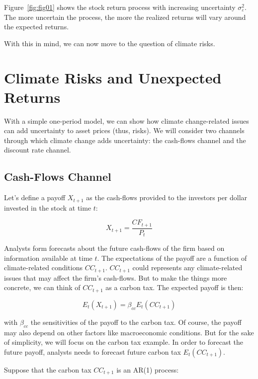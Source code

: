 Figure~\ref{fig:fig01} shows the stock return process
with increasing uncertainty $\sigma_{\varepsilon}^2$.
The more uncertain the process, the more
the realized returns will vary around the
expected returns. 

With this in mind, we can now move to the question 
of climate risks. 

\section{Climate Risks and Unexpected Returns}

With a simple one-period model, we can
show how climate change-related issues can add uncertainty
to asset prices (thus, risks).
We will consider two channels through which
climate change adds uncertainty: the cash-flows channel
and the discount rate channel.

\subsection{Cash-Flows Channel}

Let's define a payoff $X_{t+1}$ as the 
cash-flows provided to the investors per dollar invested in the stock at time $t$:

\begin{equation}
    X_{t+1} = \frac{CF_{t+1}}{P_t}
\end{equation}

Analysts form forecasts 
about the future cash-flows of the firm
based on information available at time $t$.
The expectations of the payoff
are a function of climate-related
conditions $CC_{t+1}$. $CC_{t+1}$ could represents 
any climate-related issues that may affect the
firm's cash-flows. But to make the things more 
concrete, we can think of $CC_{t+1}$ as 
a carbon tax. 
The expected payoff is then:

\begin{equation}
    E_t(X_{t+1}) = \beta_{cc} E_t(CC_{t+1})
\end{equation}

with $\beta_{cc}$ the sensitivities of 
the payoff to the carbon tax. Of course,
the payoff may also depend on other factors
like macroeconomic conditions. But 
for the sake of simplicity, we will focus
on the carbon tax example.
In order to forecast the future payoff, analysts 
needs to forecast future carbon tax
$E_t(CC_{t+1})$.

Suppose that the carbon tax $CC_{t+1}$ is an AR(1) process:

